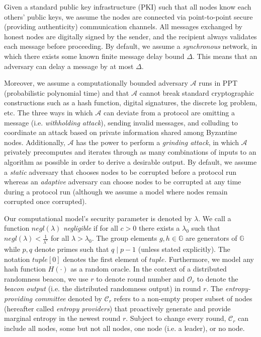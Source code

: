 \documentclass[letterpaper,twocolumn,10pt]{article}
\theoremstyle{definition}
\theoremstyle{remark}
\begin{document}
Given a standard public key infrastructure (PKI) such that all nodes know each others' public keys, we assume the nodes are connected via point-to-point secure (providing authenticity) communication channels. All messages exchanged by honest nodes are digitally signed by the sender, and the recipient always validates each message before proceeding. By default, we assume a \textit{synchronous} network, in which there exists some known finite message delay bound $\Delta$. This means that an adversary can delay a message by at most $\Delta$.

Moreover, we assume a computationally bounded adversary $\mathcal{A}$ runs in PPT (probabilistic polynomial time) and that $\mathcal{A}$ cannot break standard cryptographic constructions such as a hash function, digital signatures, the discrete log problem, etc. The three ways in which $\mathcal{A}$ can deviate from a protocol are omitting a message (i.e. \textit{withholding attack}), sending invalid messages, and colluding to coordinate an attack based on private information shared among Byzantine nodes. Additionally, $\mathcal{A}$ has the power to perform a \textit{grinding attack}, in which $\mathcal{A}$ privately precomputes and iterates through as many combinations of inputs to an algorithm as possible in order to derive a desirable output. By default, we assume a \textit{static} adversary that chooses nodes to be corrupted before a protocol run whereas an \textit{adaptive} adversary can choose nodes to be corrupted at any time during a protocol run (although we assume a model where nodes remain corrupted once corrupted).

Our computational model's security parameter is denoted by $\lambda$. We call a function $negl(\lambda)$ \textit{negligible} if for all $c > 0$ there exists a $\lambda_0$ such that $negl(\lambda) < \frac{1}{\lambda^c}$ for all $\lambda > \lambda_0$. The group elements $g, h \in \mathbb{G}$ are generators of $\mathbb{G}$ while $p, q$ denote primes such that $q \mid p - 1$ (unless stated explicitly). The notation $tuple[0]$ denotes the first element of $tuple$. Furthermore, we model any hash function $H(\cdot)$ as a random oracle. In the context of a distributed randomness beacon, we use $r$ to denote round number and $\mathcal{O}_r$ to denote the \textit{beacon output} (i.e. the distributed randomness output) in round $r$. The \textit{entropy-providing committee} denoted by $\mathcal{C}_r$ refers to a non-empty proper subset of nodes (hereafter called \textit{entropy providers}) that proactively generate and provide marginal entropy in the newest round $r$. Subject to change every round, $\mathcal{C}_r$ can include all nodes, some but not all nodes, one node (i.e. a leader), or no node.
\end{document}
